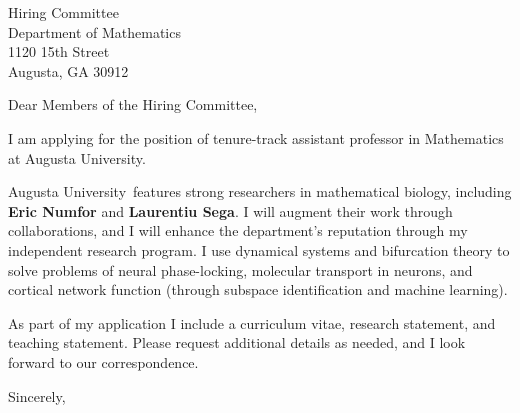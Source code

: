 \documentclass[11pt,a4paper]{letter}
\begin{document}
\def\School{Augusta University}
\begin{letter}
{Hiring Committee\\
Department of Mathematics\\
1120 15th Street\\
Augusta, GA 30912}


\opening{Dear Members of the Hiring Committee,}

I am applying for the position of tenure-track assistant professor in Mathematics at \School. 



\School~features strong researchers in mathematical biology, including \textbf{Eric Numfor} and \textbf{Laurentiu Sega}. I will augment their work through collaborations, and I will enhance the department's reputation through my independent research program. I use dynamical systems and bifurcation theory to solve problems of neural phase-locking, molecular transport in neurons, and cortical network function (through subspace identification and machine learning).



As part of my application I include a curriculum vitae, research statement, and teaching statement. Please request additional details as needed, and I look forward to our correspondence.

\closing{Sincerely,}
\end{letter}
\end{document}
